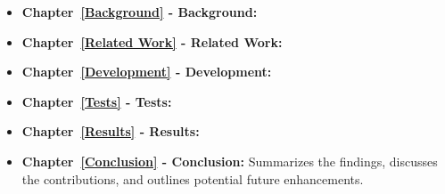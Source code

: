 \begin{itemize}
\item \textbf{Chapter~\ref{Background} - Background:}
\item \textbf{Chapter~\ref{Related Work} -  Related Work:}
\item \textbf{Chapter~\ref{Development} -  Development:}
\item \textbf{Chapter~\ref{Tests} - Tests:}
\item \textbf{Chapter~\ref{Results} -  Results:}
\item \textbf{Chapter~\ref{Conclusion} - Conclusion:} Summarizes the findings, discusses the contributions, and outlines potential future enhancements.
\end{itemize}












